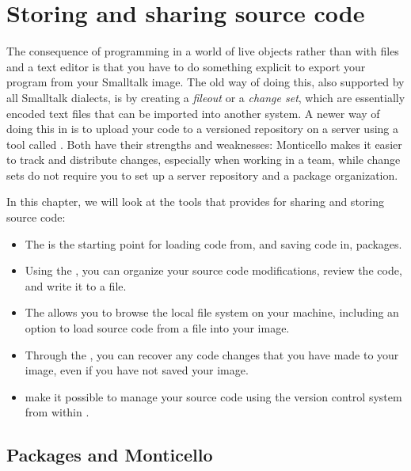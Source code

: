 \documentclass[a4paper,10pt,twoside]{book}
\begin{document}
\renewcommand{\nnbb}[2]{} %
\fi
\chapter{Storing and sharing source code}
\label{cha:VersionControl}

The consequence of programming in a world of live objects rather than with files and a text editor is that you have to do something explicit to export your program from your Smalltalk image.
The old way of doing this, also supported by all Smalltalk dialects, is by creating a \emph{fileout} or a \emph{change set}, which are essentially encoded text files that can be imported into another system.
A newer way of doing this in \Squeak is to upload your code to a versioned repository on a server using a tool called .
Both have their strengths and weaknesses: Monticello makes it easier to track and distribute changes, especially when working in a team, while change sets do not require you to set up a server repository and a package organization.

In this chapter, we will look at the tools that \Squeak provides for sharing and storing source code:

\begin{itemize}
	\item{The } is the starting point for loading code from, and saving code in,  packages.
	\item{Using the ,} you can organize your source code modifications, review the code, and write it to a file.
	\item{The  allows you to browse the local file system on your machine, including an option to load source code from a file into your image.}
	\item{Through the }, you can recover any code changes that you have made to your image, even if you have not saved your image.
	\item{} make it possible to manage your source code using the  version control system from within \Squeak.
\end{itemize}

\section{Packages and Monticello}
\label{sec:packages_and_monticello}
\end{document}
